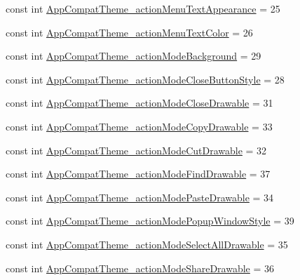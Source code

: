 \begin{DoxyCompactItemize}
\item 
const int \mbox{\hyperlink{class_f_w_p_s___app_1_1_droid_1_1_resource_1_1_styleable_a87bbed4e9a4411e0e00e5086062d0e45}{App\+Compat\+Theme\+\_\+action\+Menu\+Text\+Appearance}} = 25
\item 
const int \mbox{\hyperlink{class_f_w_p_s___app_1_1_droid_1_1_resource_1_1_styleable_af662b5fb187d348f65fa5685728a368c}{App\+Compat\+Theme\+\_\+action\+Menu\+Text\+Color}} = 26
\item 
const int \mbox{\hyperlink{class_f_w_p_s___app_1_1_droid_1_1_resource_1_1_styleable_a06e89b5f82a0ab48011de00cf5120909}{App\+Compat\+Theme\+\_\+action\+Mode\+Background}} = 29
\item 
const int \mbox{\hyperlink{class_f_w_p_s___app_1_1_droid_1_1_resource_1_1_styleable_ac0d59a5e2e95f72eed22cf7a89c3b1e0}{App\+Compat\+Theme\+\_\+action\+Mode\+Close\+Button\+Style}} = 28
\item 
const int \mbox{\hyperlink{class_f_w_p_s___app_1_1_droid_1_1_resource_1_1_styleable_a4c3aea0fa53bbdba9721edec50c1a098}{App\+Compat\+Theme\+\_\+action\+Mode\+Close\+Drawable}} = 31
\item 
const int \mbox{\hyperlink{class_f_w_p_s___app_1_1_droid_1_1_resource_1_1_styleable_accfd80c2017ccd33e8dd5a59dfcc5b91}{App\+Compat\+Theme\+\_\+action\+Mode\+Copy\+Drawable}} = 33
\item 
const int \mbox{\hyperlink{class_f_w_p_s___app_1_1_droid_1_1_resource_1_1_styleable_a309542ead18f31aad5dcc38139d20731}{App\+Compat\+Theme\+\_\+action\+Mode\+Cut\+Drawable}} = 32
\item 
const int \mbox{\hyperlink{class_f_w_p_s___app_1_1_droid_1_1_resource_1_1_styleable_a09b756b016d770fbbe915e407ee028a4}{App\+Compat\+Theme\+\_\+action\+Mode\+Find\+Drawable}} = 37
\item 
const int \mbox{\hyperlink{class_f_w_p_s___app_1_1_droid_1_1_resource_1_1_styleable_aed98eb8d51e58785cf865d4a1df76cc8}{App\+Compat\+Theme\+\_\+action\+Mode\+Paste\+Drawable}} = 34
\item 
const int \mbox{\hyperlink{class_f_w_p_s___app_1_1_droid_1_1_resource_1_1_styleable_af0953456d1df87bc3bc9a0ff48964491}{App\+Compat\+Theme\+\_\+action\+Mode\+Popup\+Window\+Style}} = 39
\item 
const int \mbox{\hyperlink{class_f_w_p_s___app_1_1_droid_1_1_resource_1_1_styleable_a64b7fc1c549aca5e03db398be90cfc01}{App\+Compat\+Theme\+\_\+action\+Mode\+Select\+All\+Drawable}} = 35
\item 
const int \mbox{\hyperlink{class_f_w_p_s___app_1_1_droid_1_1_resource_1_1_styleable_a534020be0d0ddae88a886fbc02534215}{App\+Compat\+Theme\+\_\+action\+Mode\+Share\+Drawable}} = 36

\end{DoxyCompactItemize}
